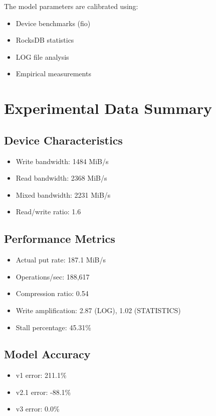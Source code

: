 \documentclass[11pt,twocolumn]{article}
\begin{document}
The model parameters are calibrated using:
\begin{itemize}
    \item Device benchmarks (fio)
    \item RocksDB statistics
    \item LOG file analysis
    \item Empirical measurements
\end{itemize}

\section{Experimental Data Summary}

\subsection{Device Characteristics}
\begin{itemize}
    \item Write bandwidth: 1484 MiB/s
    \item Read bandwidth: 2368 MiB/s
    \item Mixed bandwidth: 2231 MiB/s
    \item Read/write ratio: 1.6
\end{itemize}

\subsection{Performance Metrics}
\begin{itemize}
    \item Actual put rate: 187.1 MiB/s
    \item Operations/sec: 188,617
    \item Compression ratio: 0.54
    \item Write amplification: 2.87 (LOG), 1.02 (STATISTICS)
    \item Stall percentage: 45.31\%
\end{itemize}

\subsection{Model Accuracy}
\begin{itemize}
    \item v1 error: 211.1\%
    \item v2.1 error: -88.1\%
    \item v3 error: 0.0\%
\end{itemize}
\end{document}
